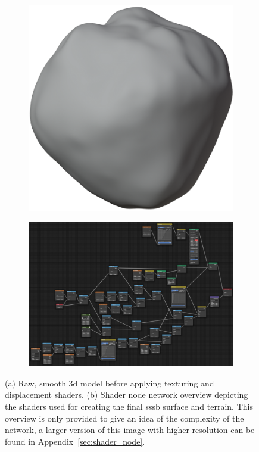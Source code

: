 \begin{figure}[htb]
    \centering
    \begin{subfigure}[b]{0.48\textwidth}
        \centering
        \includegraphics[width=.7\textwidth]{doc/thesis/0_figures/procedural_terrain/smooth_model.png}
        \caption{}
        \label{fig:smooth_model}
    \end{subfigure}
    \begin{subfigure}[b]{0.48\textwidth}
        \centering
        \includegraphics[width=\textwidth]{doc/thesis/0_figures/procedural_terrain/node_network.png}
        \caption{}
        \label{fig:shader_nodes}
    \end{subfigure}
    \caption{(a) Raw, smooth \gls{3d} model before applying texturing and displacement shaders. (b) Shader node network overview depicting the shaders used for creating the final \gls{sssb} surface and terrain. This overview is only provided to give an idea of the complexity of the network, a larger version of this image with higher resolution can be found in Appendix~\ref{sec:shader_node}.}
\end{figure}

